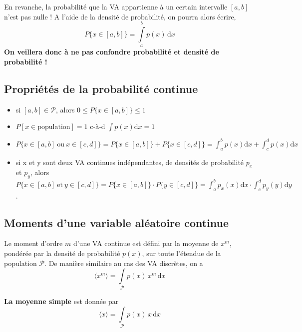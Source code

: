 En revanche, la probabilité que la VA appartienne à un certain intervalle $[a,b]$ n'est pas nulle ! A l'aide de la densité de probabilité, on pourra alors écrire,
\begin{equation}
P\{x\in[a,b]\}=\int\limits_{a}^{b}p(x)\,\text{d}x
\end{equation}
\textbf{On veillera donc à ne pas confondre probabilité et densité de probabilité !}

\subsection{Propriétés de la probabilité continue}

\begin{itemize}\itemsep1pt
\renewcommand{\labelitemi}{$\bullet$}
\item si $[a,b]\in\mathcal{P}$, alors $0\le P\{x\in[a,b]\}\le 1$
\item $P[x\in\text{population}]=1$ c-à-d $\int p(x)\text{d}x=1$
\item $P\{x\in[a,b]\ \text{ou}\ x\in[c,d]\}=P\{x\in[a,b]\}+P\{x\in[c,d]\}=\int_{a}^{b} p(x)\text{d}x+\int_{c}^{d} p(x)\text{d}x$
\item si x et y sont deux VA continues indépendantes, de densités de probabilité $p_x$ et $p_y$, alors $P\{x\!\in\![a,b]\ \text{et}\ y\!\in\![c,d]\}=P\{x\!\in\![a,b]\}\cdot P\{y\!\in\![c,d]\}=\int_{a}^{b} p_x(x)\text{d}x\cdot\!\int_{c}^{d} p_y(y)\text{d}y$.
\end{itemize}

\subsection{Moments d'une variable aléatoire continue}\label{par:mdvac}

Le moment d'ordre $m$ d'une VA continue est défini par la moyenne de $x^m$, pondérée par la densité de probabilité $p(x)$, sur toute l'étendue de la population $\mathcal{P}$. De manière similaire au cas des VA discrètes, on a
\begin{equation}
\langle x^m\rangle=\int\limits_{\mathcal{P}}p(x)\,x^m\,\text{d}x
\label{eq:mdvac}
\end{equation}

\textbf{La moyenne simple} est donnée par
\begin{equation}
\langle x\rangle=\int\limits_{\mathcal{P}}p(x)\,x\,\text{d}x
\end{equation}

